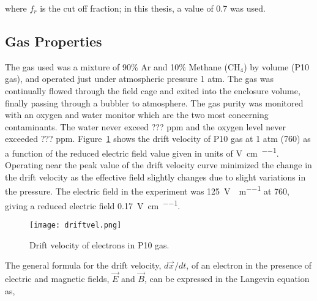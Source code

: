 where $f_r$ is the cut off fraction; in this thesis, a value of 0.7 was used. 








\subsection{Gas Properties}
The gas used was a mixture of 90\% Ar and 10\% Methane ($\mathrm{CH_4}$) by volume (P10 gas), and operated just under atmospheric pressure 1 atm. The gas was continually flowed through the field cage and exited into the enclosure volume, finally passing through a bubbler to atmosphere. The gas purity was monitored with an oxygen and water monitor which are the two most concerning contaminants. The water never exceed  ??? ppm  and the oxygen level never exceeded ??? ppm. Figure~\ref{fig:driftvel} shows the drift velocity of P10 gas at 1 atm (\SI{760}{\torr}) as a function of the reduced electric field value given in units of \si{\volt\per\centi\metre\per\torr}. Operating near the peak value of the drift velocity curve minimized the change in the drift velocity as the effective field slightly changes due to slight variations in the pressure. The electric field in the experiment was \SI{125}{\volt\per\centi\per\metre} at \SI{760}{\torr}, giving a reduced electric field \SI{0.17}{\volt\per\centi\metre\per\torr}.

\begin{figure}[H]
\texttt{[image: driftvel.png]}
\caption{Drift velocity of electrons in P10 gas.}
\label{fig:driftvel}
\end{figure}

The general formula for the drift velocity, $d\vec{x}/dt$, of an electron in the presence of electric and magnetic fields, $\vec{E}$ and $\vec{B}$, can be expressed in the Langevin equation as,  

